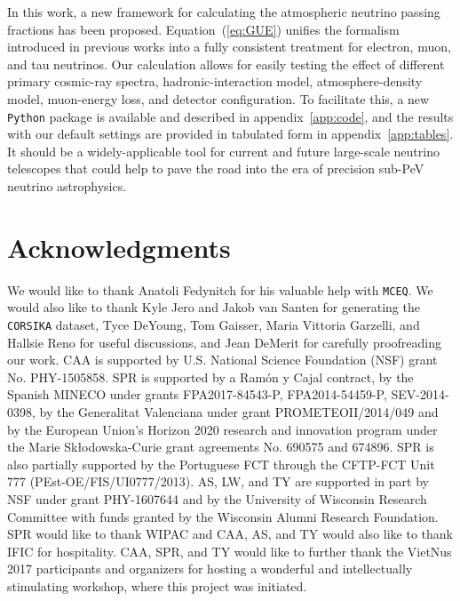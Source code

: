 \documentclass[aps,prd,showpacs,letterpaper,onecolumn,longbibliography,superscriptaddress,notitlepage,nofootinbib]{revtex4-1}%
\newcommand{\MCEq}{\texttt{MCE{\scriptsize Q}}}
\newcommand{\CORSIKA}{\texttt{CORSIKA}}
\newcommand{\Python}{\texttt{Python}}
\begin{document}
In this work, a new framework for calculating the atmospheric neutrino passing fractions has been proposed. Equation~(\ref{eq:GUE}) unifies the formalism introduced in previous works into a fully consistent treatment for electron, muon, and tau neutrinos. Our calculation allows for easily testing the effect of different primary cosmic-ray spectra, hadronic-interaction model, atmosphere-density model, muon-energy loss, and detector configuration. To facilitate this, a new \Python{} package is available and described in appendix~\ref{app:code}, and the results with our default settings are provided in tabulated form in appendix~\ref{app:tables}. It should be a widely-applicable tool for current and future large-scale neutrino telescopes that could help to pave the road into the era of precision sub-PeV neutrino astrophysics.

\section*{Acknowledgments}

We would like to thank Anatoli Fedynitch for his valuable help with \MCEq{}. We would also like to thank Kyle Jero and Jakob van Santen for generating the \CORSIKA{} dataset, Tyce DeYoung, Tom Gaisser, Maria Vittoria Garzelli, and Hallsie Reno for useful discussions, and Jean DeMerit for carefully proofreading our work. 
CAA is supported by U.S. National Science Foundation (NSF) grant No. PHY-1505858.
SPR is supported by a Ram\'on y Cajal contract, by the Spanish MINECO under grants FPA2017-84543-P, FPA2014-54459-P,  SEV-2014-0398, by the Generalitat Valenciana under grant PROMETEOII/2014/049 and by the European Union's Horizon 2020 research and innovation program under the Marie Sk\l odowska-Curie grant agreements No. 690575 and 674896. SPR is also partially supported by the Portuguese FCT through the CFTP-FCT Unit 777 (PEst-OE/FIS/UI0777/2013).  
AS, LW, and TY are supported in part by NSF under grant PHY-1607644 and by the University of Wisconsin Research Committee with funds granted by the Wisconsin Alumni Research Foundation. 
SPR would like to thank WIPAC and CAA, AS, and TY would also like to thank IFIC for hospitality. 
CAA, SPR, and TY would like to further thank the VietNus 2017 participants and organizers for hosting a wonderful and intellectually stimulating workshop, where this project was initiated. 



\newpage

\appendix
\end{document}
